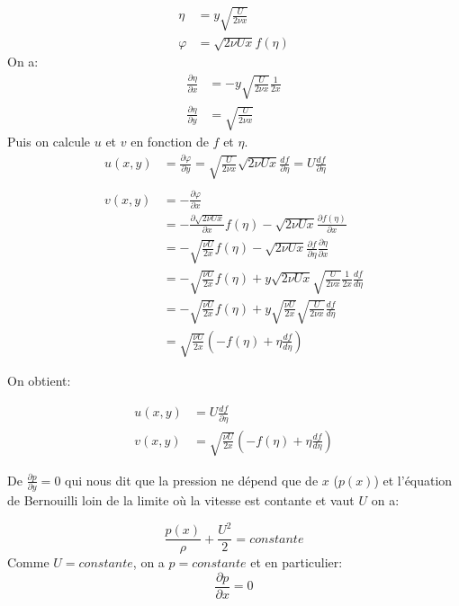\documentclass[french]{article}
\begin{document}
\begin{align*}
	\eta &= y \sqrt{\frac{U}{2\nu x }} \\
	\varphi &= \sqrt{2\nu U x} f(\eta)
\end{align*}
On a:
\begin{align}
	\frac{\partial \eta}{\partial x} &= 
	-y\sqrt{\frac{U}{2\nu x}}\frac{1}{2x}\\
	\frac{\partial \eta}{\partial y} &= 
	\sqrt{\frac{U}{2\nu x }}
\end{align}
Puis on calcule $u$ et $v$ en fonction de $f$ et $\eta$.
\begin{align*}
	u(x,y) &= 
	\frac{\partial \varphi}{\partial y} 
	=
	\sqrt{\frac{U}{2\nu x }} \sqrt{2\nu U x}\frac{d f}{\partial \eta}
	= U \frac{d f}{\partial \eta}\\
	\\
	v(x,y) &= 
	- \frac{\partial \varphi}{\partial x} \\
	&=
	-\frac{\partial \sqrt{2\nu U x}} {\partial x}
	f(\eta) -
	\sqrt{2\nu Ux }
	\frac{\partial f(\eta)}{\partial x}\\
	&= 
	-\sqrt{\frac{\nu U}{2x}}
	f(\eta) -
	\sqrt{2\nu Ux }
	\frac{\partial f}{\partial \eta}
	\frac{\partial \eta}{\partial x}\\
	&=
	-\sqrt{\frac{\nu U}{2x}}
	f(\eta) +
	y\sqrt{2\nu Ux}\sqrt{\frac{U}{2\nu x}}\frac{1}{2x}\frac{d f}{d \eta}
	\\
	&=
	-\sqrt{\frac{\nu U}{2x}}
	f(\eta) +
	y\sqrt{\frac{\nu U}{2x}}\sqrt{\frac{U}{2\nu x}}\frac{d f}{d \eta}
	\\
	&=
	\sqrt{\frac{\nu U}{2x}}
	\left(
	-f(\eta) + \eta\frac{d f}{d \eta}
	\right)
\end{align*}

On obtient:

\begin{align}
	u(x,y) &= 
	 U \frac{d f}{\partial \eta}\\
	v(x,y) &= 
	\sqrt{\frac{\nu U}{2x}}
	\left(
	-f(\eta) + \eta\frac{d f}{d \eta}
	\right)
\end{align}

De $\frac{\partial p}{\partial y} = 0$ qui nous dit que la pression ne dépend que de $x$ ($p(x)$) et l'équation de Bernouilli loin de la limite où la vitesse est contante et vaut $U$ on a:


\begin{equation*}
	\frac{p(x)}{\rho} + \frac{U^2}{2} = constante
\end{equation*}
Comme $U = constante$, on a $p = constante$ et en particulier:
\begin{equation}
	\frac{\partial p}{\partial x}  = 0
\end{equation}
\end{document}
